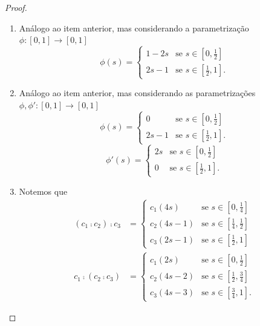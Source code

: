 \begin{proof}
\begin{enumerate}
	\item Análogo ao item anterior, mas considerando a parametrização $\phi: [0,1] \to [0,1]$
	\begin{equation*}
	\phi(s)
		=
			\begin{cases}
				1-2s &\text{se $s \in [0,\frac{1}{2}]$} \\
				2s-1 &\text{se $s \in [\frac{1}{2},1]$}.
			\end{cases}
	\end{equation*}
	
	\item Análogo ao item anterior, mas considerando as parametrizações $\phi,\phi': [0,1] \to [0,1]$
	\begin{equation*}
	\phi(s)
		=
			\begin{cases}
				0 &\text{se $s \in [0,\frac{1}{2}]$} \\
				2s-1 &\text{se $s \in [\frac{1}{2},1]$}.
			\end{cases}
	\end{equation*}
	\begin{equation*}
	\phi'(s)
		=
			\begin{cases}
				2s &\text{se $s \in [0,\frac{1}{2}]$} \\
				0 &\text{se $s \in [\frac{1}{2},1]$}.
			\end{cases}
	\end{equation*}
	
	\item Notemos que
	\begin{align*}
	(c_1 \comp c_2) \comp c_3 &=
		\begin{cases}
		c_1 (4s) &\text{se $s \in [0,\frac{1}{4}]$}  \\
		c_2(4s-1) &\text{se $s \in [\frac{1}{4},\frac{1}{2}]$} \\
		c_3(2s-1) &\text{se $s \in [\frac{1}{2},1]$}
		\end{cases} \\
	c_1 \comp (c_2 \comp c_3) &=
		\begin{cases}
		c_1 (2s) &\text{se $s \in [0,\frac{1}{2}]$}  \\
		c_2(4s-2) &\text{se $s \in [\frac{1}{2},\frac{3}{4}]$} \\
		c_3(4s-3) &\text{se $s \in [\frac{3}{4},1]$}.
		\end{cases}
	\end{align*}
	

\end{enumerate}
\end{proof}
